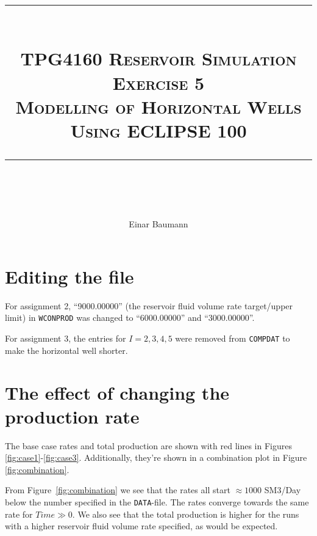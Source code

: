 



\author{Einar Baumann}
\title{
    \vspace{-1in}
    \vspace{0.1in}
    \rule{\textwidth}{0.5pt} \\[0.5cm]
    \normalfont \normalsize \textsc{TPG4160 Reservoir Simulation} \\ [20pt]
    {\textsc{ \huge Exercise 5 }} \\ [0.5cm]
    {\textsc {\Large Modelling of Horizontal Wells Using ECLIPSE 100} } \\
    \vspace{0.1in}
    \rule{\textwidth}{2pt} \\[0.7cm]
}


\maketitle
\thispagestyle{empty}
\clearpage

\section{Editing the file} %
\label{sec:editing_the_file}
For assignment 2, ``9000.00000'' (the reservoir fluid volume rate target/upper limit) in \texttt{WCONPROD} was changed to ``6000.00000'' and ``3000.00000''.

For assignment 3, the entries for $I=2,3,4,5$ were removed from \texttt{COMPDAT} to make the horizontal well shorter.


\section{The effect of changing the production rate} %
\label{sec:long_}
The base case rates and total production are shown with red lines in Figures \ref{fig:case1}-\ref{fig:case3}. Additionally, they're shown in a combination plot in Figure \ref{fig:combination}.

From Figure~\ref{fig:combination} we see that the rates all start $\approx 1000$ SM3/Day below the number specified in the \texttt{DATA}-file. The rates converge towards the same rate for $Time\gg 0$. We also see that the total production is higher for the runs with a higher reservoir fluid volume rate specified, as would be expected.

